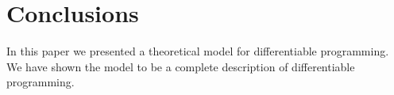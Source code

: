 \section{Conclusions}

In this paper we presented a theoretical model for differentiable programming. We have shown the model to be a complete description of differentiable programming. 
